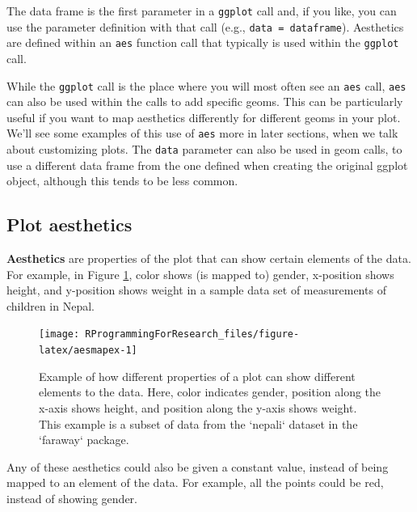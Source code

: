 \documentclass[]{book}
\makeatletter
\newenvironment{kframe}{%
\medskip{}
\setlength{\fboxsep}{.8em}
 \def\at@end@of@kframe{}%
 \ifinner\ifhmode%
  \def\at@end@of@kframe{\end{minipage}}%
  \begin{minipage}{\columnwidth}%
 \fi\fi%
 \def\FrameCommand##1{\hskip\@totalleftmargin \hskip-\fboxsep
 \colorbox{shadecolor}{##1}\hskip-\fboxsep
     \hskip-\linewidth \hskip-\@totalleftmargin \hskip\columnwidth}%
 \MakeFramed {\advance\hsize-\width
   \@totalleftmargin\z@ \linewidth\hsize
   \@setminipage}}%
 {\par\unskip\endMakeFramed%
 \at@end@of@kframe}
\newenvironment{rmdblock}[1]
  {
  \begin{itemize}
  \renewcommand{\labelitemi}{
    \raisebox{-.7\height}[0pt][0pt]{
      {\setkeys{Gin}{width=3em,keepaspectratio}\texttt{[image: images/\#1]}}
    }
  }
  \setlength{\fboxsep}{1em}
  \begin{kframe}
  \item
  }
  {
  \end{kframe}
  \end{itemize}
  }
\newenvironment{rmdnote}
  {\begin{rmdblock}{note}}
  {\end{rmdblock}}
\theoremstyle{definition}
\theoremstyle{definition}
\theoremstyle{definition}
\theoremstyle{remark}
\makeatother
\begin{document}
The data frame is the first parameter in a \texttt{ggplot} call and, if
you like, you can use the parameter definition with that call (e.g.,
\texttt{data\ =\ dataframe}). Aesthetics are defined within an
\texttt{aes} function call that typically is used within the
\texttt{ggplot} call.

\begin{rmdnote}
While the \texttt{ggplot} call is the place where you will most often
see an \texttt{aes} call, \texttt{aes} can also be used within the calls
to add specific geoms. This can be particularly useful if you want to
map aesthetics differently for different geoms in your plot. We'll see
some examples of this use of \texttt{aes} more in later sections, when
we talk about customizing plots. The \texttt{data} parameter can also be
used in geom calls, to use a different data frame from the one defined
when creating the original ggplot object, although this tends to be less
common.
\end{rmdnote}

\subsection{Plot aesthetics}\label{plot-aesthetics}

\textbf{Aesthetics} are properties of the plot that can show certain
elements of the data. For example, in Figure \ref{fig:aesmapex}, color
shows (is mapped to) gender, x-position shows height, and y-position
shows weight in a sample data set of measurements of children in Nepal.

\begin{figure}

{\centering \texttt{[image: RProgrammingForResearch\_files/figure-latex/aesmapex-1]} 

}

\caption{Example of how different properties of a plot can show different elements to the data. Here, color indicates gender, position along the x-axis shows height, and position along the y-axis shows weight. This example is a subset of data from the `nepali` dataset in the `faraway` package.}\label{fig:aesmapex}
\end{figure}

\begin{rmdnote}
Any of these aesthetics could also be given a constant value, instead of
being mapped to an element of the data. For example, all the points
could be red, instead of showing gender.
\end{rmdnote}
\end{document}
